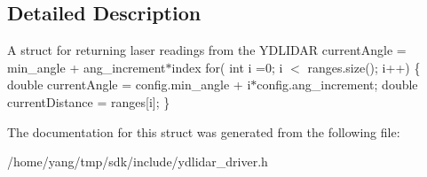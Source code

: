 \subsection{Detailed Description}
A struct for returning laser readings from the Y\+D\+L\+I\+D\+AR current\+Angle = min\+\_\+angle + ang\+\_\+increment$\ast$index for( int i =0; i $<$ ranges.\+size(); i++) \{ double current\+Angle = config.\+min\+\_\+angle + i$\ast$config.ang\+\_\+increment; double current\+Distance = ranges\mbox{[}i\mbox{]}; \} 

The documentation for this struct was generated from the following file\+:\begin{DoxyCompactItemize}
\item 
/home/yang/tmp/sdk/include/ydlidar\+\_\+driver.\+h\end{DoxyCompactItemize}
